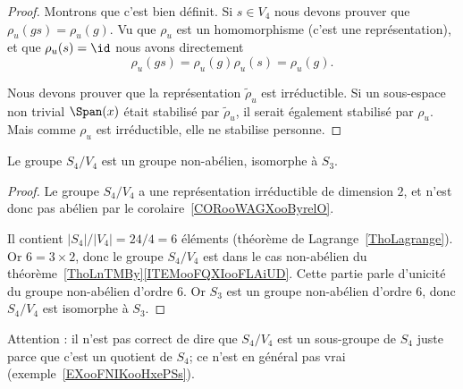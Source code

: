 \begin{proof}
	Montrons que c'est bien définit. Si \( s\in V_4\) nous devons prouver que \( \rho_u(gs)=\rho_u(g)\). Vu que \( \rho_u\) est un homomorphisme (c'est une représentation), et que \( \rho_u(s)=\id\) nous avons directement
	\begin{equation}
		\rho_u(gs)=\rho_u(g)\rho_u(s)=\rho_u(g).
	\end{equation}

	Nous devons prouver que la représentation \( \tilde \rho_u\) est irréductible. Si un sous-espace non trivial \( \Span(x)\) était stabilisé par \( \tilde \rho_u\), il serait également stabilisé par \( \rho_u\). Mais comme \( \rho_u\) est irréductible, elle ne stabilise personne.
\end{proof}

\begin{lemma}
	Le groupe \( S_4/V_4\) est un groupe non-abélien, isomorphe à \( S_3\).
\end{lemma}

\begin{proof}
	Le groupe \( S_4/V_4\) a une représentation irréductible de dimension \( 2\), et n'est donc pas abélien par le corolaire~\ref{CORooWAGXooByrelO}.

	Il contient \( | S_4 |/| V_4 |=24/4=6\) éléments (théorème de Lagrange~\ref{ThoLagrange}). Or \( 6=3\times 2\), donc le groupe \( S_4/V_4\) est dans le cas non-abélien du théorème~\ref{ThoLnTMBy}\ref{ITEMooFQXIooFLAiUD}. Cette partie parle d'unicité du groupe non-abélien d'ordre \( 6\). Or \( S_3\) est un groupe non-abélien d'ordre \( 6\), donc \( S_4/V_4\) est isomorphe à \( S_3\).
\end{proof}

Attention : il n'est pas correct de dire que \( S_4/V_4\) est un sous-groupe de \( S_4\) juste parce que c'est un quotient de \( S_4\); ce n'est en général pas vrai (exemple~\ref{EXooFNIKooHxePSs}).

